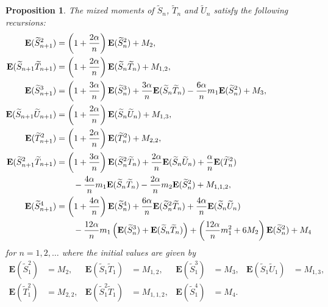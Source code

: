 \documentclass[12pt,a4paper]{article}
\newtheorem{prop}[thm]{Proposition}
\newcommand{\E}{\mathbf E}
\newcommand{\wt}{\widetilde}
\numberwithin{equation}{section}
\begin{document}
\begin{prop}\label{prop:recursions}
The mixed moments of $\wt S_n$, $\wt T_n$ and $\wt U_n$ satisfy the following recursions:
\begin{align}
\E(\wt S_{n+1}^2)&=\left(1+\frac{2\alpha}n\right)\E(\wt S_n^2)+M_2,\label{recursion2}\\
\E(\wt S_{n+1}\wt T_{n+1})&=\left(1+\frac{2\alpha}n\right)\E(\wt S_n\wt T_n)+M_{1,2},\label{recursion12}\\
\E(\wt S_{n+1}^3)&=\left(1+\frac{3\alpha}n\right)\E(\wt S_n^3)+\frac{3\alpha}n\E(\wt S_n\wt T_n)-\frac{6\alpha}nm_1\E(\wt S_n^2)+M_3,\label{recursion3}\\
\E(\wt S_{n+1}\wt U_{n+1})&=\left(1+\frac{2\alpha}n\right)\E(\wt S_n\wt U_n)+M_{1,3},\label{recursion13}\\
\E(\wt T_{n+1}^2)&=\left(1+\frac{2\alpha}n\right)\E(\wt T_n^2)+M_{2,2},\label{recursion22}\\
\E(\wt S_{n+1}^2\wt T_{n+1})
&=\left(1+\frac{3\alpha}n\right)\E(\wt S_n^2\wt T_n)+\frac{2\alpha}n\E(\wt S_n\wt U_n)+\frac\alpha n\E(\wt T_n^2)\label{recursion112}\\
&\qquad-\frac{4\alpha}nm_1\E(\wt S_n\wt T_n)-\frac{2\alpha}nm_2\E(\wt S_n^2)+M_{1,1,2},\notag\\
\E(\wt S_{n+1}^4)&=\left(1+\frac{4\alpha}n\right)\E(\wt S_n^4)+\frac{6\alpha}n\E(\wt S_n^2\wt T_n)+\frac{4\alpha}n\E(\wt S_n\wt U_n)\label{recursion4}\\
&\qquad-\frac{12\alpha}nm_1\left(\E(\wt S_n^3)+\E(\wt S_n\wt T_n)\right)+\left(\frac{12\alpha}nm_1^2+6M_2\right)\E(\wt S_n^2)+M_4\notag
\end{align}
for $n=1,2,\dots$ where the initial values are given by
\begin{equation}\begin{aligned}
\E(\wt S_1^2)&=M_2,&\E(\wt S_1\wt T_1)&=M_{1,2},&\E(\wt S_1^3)&=M_3,&\E(\wt S_1\wt U_1)&=M_{1,3},\\
\E(\wt T_1^2)&=M_{2,2},&\E(\wt S_1^2\wt T_1)&=M_{1,1,2},&\E(\wt S_1^4)&=M_4.
\end{aligned}\end{equation}
\end{prop}
\end{document}

